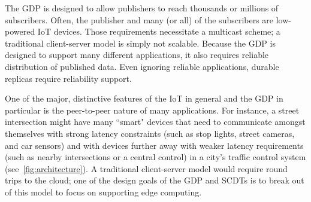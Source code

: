 The GDP is designed to allow publishers to reach thousands or millions of subscribers. Often, the publisher and many (or all) of the subscribers are low-powered IoT devices. Those requirements necessitate a multicast scheme; a traditional client-server model is simply not scalable. Because the GDP is designed to support many different applications, it also requires reliable distribution of published data. Even ignoring reliable applications, durable replicas require reliability support.

One of the major, distinctive features of the IoT in general and the GDP in particular is the peer-to-peer nature of many applications. For instance, a street intersection might have many ``smart" devices that need to communicate amongst themselves with strong latency constraints (such as stop lights, street cameras, and car sensors) and with devices further away with weaker latency requirements (such as nearby intersections or a central control) in a city's traffic control system (see~\autoref{fig:architecture}). A traditional client-server model would require round trips to the cloud; one of the design goals of the GDP and SCDTs is to break out of this model to focus on supporting edge computing.


